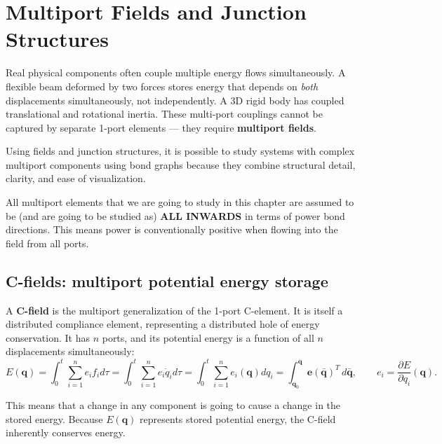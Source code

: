 \chapter{Multiport Fields and Junction Structures}
\label{ch:fields}

Real physical components often couple multiple energy flows simultaneously. A flexible beam deformed by two forces stores energy that depends on \emph{both} displacements simultaneously, not independently. A 3D rigid body has coupled translational and rotational inertia. These multi-port couplings cannot be captured by separate 1-port elements — they require \textbf{multiport fields}. 

Using fields and junction structures, it is possible to study systems with complex multiport components using bond graphs because they combine structural detail, clarity, and ease of visualization. 

\begin{insightbox}
All multiport elements that we are going to study in this chapter are assumed to be (and are going to be studied as) \textbf{ALL INWARDS} in terms of power bond directions. This means power is conventionally positive when flowing into the field from all ports.
\end{insightbox}

\section{C-fields: multiport potential energy storage}

A \textbf{C-field} is the multiport generalization of the 1-port C-element. It is itself a distributed compliance element, representing a distributed hole of energy conservation. It has $n$ ports, and its potential energy is a function of all $n$ displacements simultaneously:
\begin{equation}
  E(\mathbf{q}) = \int_{0}^{t} \sum_{i=1}^{n} e_i f_i d\tau = 
  \int_{0}^{t} \sum_{i=1}^{n} e_i \dot{q}_i d\tau = 
  \int_{0}^{t} \sum_{i=1}^{n} e_i(\mathbf{q}) dq_i =  
  \int_{\mathbf{q}_0}^{\mathbf{q}} \mathbf{e}(\bar{\mathbf{q}})^T\,d\bar{\mathbf{q}}, \qquad
  e_i = \frac{\partial E}{\partial q_i}(\mathbf{q}).
\end{equation}

This means that a change in any component is going to cause a change in the stored energy. Because $E(\mathbf{q})$ represents stored potential energy, the C-field inherently conserves energy.

